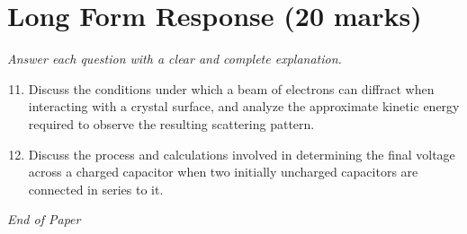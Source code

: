 \documentclass[12pt]{article}
\begin{document}
\section*{Long Form Response (20 marks)}
\textit{Answer each question with a clear and complete explanation.}
\begin{enumerate}[label=\arabic*.]
\setcounter{enumi}{10}
\item Discuss the conditions under which a beam of electrons can diffract when interacting with a crystal surface, and analyze the approximate kinetic energy required to observe the resulting scattering pattern.
\item Discuss the process and calculations involved in determining the final voltage across a charged capacitor when two initially uncharged capacitors are connected in series to it.
\end{enumerate}

\vfill
\noindent\textit{End of Paper}
\end{document}
